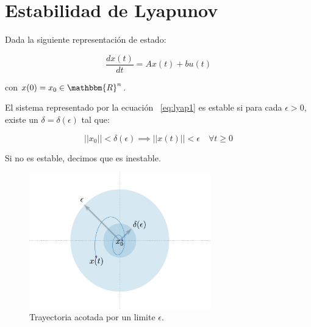 
\chapter{Estabilidad de Lyapunov}

    Dada la siguiente representación de estado:

    \begin{equation} \label{eq:lyap1}
        \frac{dx(t)}{dt} = A x(t) + b u(t)
    \end{equation}

    con $x(0) = x_0  \in \mathbbm{R}^n$.

    \begin{definicion}
        El sistema representado por la ecuación ~\ref{eq:lyap1} es estable si para cada $\epsilon > 0$, existe un $\delta = \delta(\epsilon)$ tal que:

        \begin{equation*}
            ||x_0|| < \delta(\epsilon) \implies  ||x(t)||  < \epsilon \quad \forall t \ge 0
        \end{equation*}

        Si no es estable, decimos que es inestable.

        \begin{figure}
            \centering
            \includegraphics[width=0.7\textwidth]{./imagenes/trayectoriaacotada.pdf}
            \caption{\label{fig:trayectoriaestable}Trayectoria acotada por un limite $\epsilon$.}
        \end{figure}


    \end{definicion}


